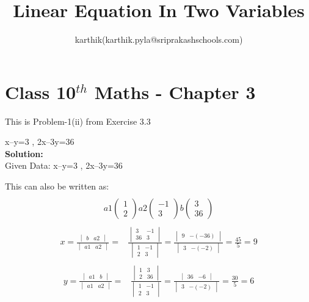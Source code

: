 \documentclass[12pt]{article}
\title{Linear Equation In Two Variables}
\author{karthik(karthik.pyla@sriprakashschools.com)}
\newcommand{\myvec}[1]{\ensuremath{\begin{pmatrix}#1\end{pmatrix}}}
\newcommand{\mydet}[1]{\ensuremath{\begin{vmatrix}#1\end{vmatrix}}}
\newcommand{\solution}{\noindent \textbf{Solution: }}
\begin{document}
\maketitle
\section*{Class 10$^{th}$ Maths - Chapter 3}
This is Problem-1(ii) from Exercise 3.3
\item  x–y=3 , 2x–3y=36 \\

\solution \\
Given Data: x–y=3 , 2x–3y=36

This can also be written as:
\begin{align}
\\a1 \myvec{1\\2} a2 \myvec{-1\\3}b\myvec{3\\36}
\end{align}
\begin{align}
\\x = \frac{\mydet{ b & a2}}{\mydet{ a1 & a2}} =&
\frac{\mydet{ 3 & -1\\ 36 & 3}}{\mydet{1&-1\\2&3}}= \frac{\mydet{ 9 &-(-36) }}{\mydet{ 3&-(-2) }}= \frac{45}{5}=9
\end{align}
\begin{align}
\\y = \frac{\mydet{ a1 & b}}{\mydet{ a1 & a2}} =&
\frac{\mydet{ 1 & 3 \\ 2 & 36}}{\mydet{1&-1\\2&3}}=   \frac{\mydet{ 36 & -6}}{\mydet{ 3 & -(-2)}} = \frac{30}{5}=6 
\end{align}

 
\end{document}
